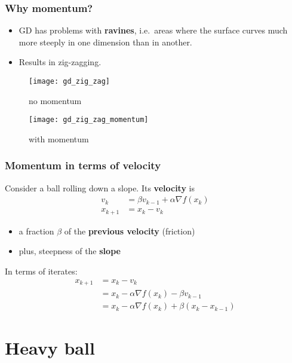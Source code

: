 \documentclass[aspectration=169]{beamer}
\begin{document}
\begin{frame}
  \frametitle{Why momentum?}
  \begin{itemize}
    \item GD has problems with \textbf{ravines}, i.e.\ areas where the surface curves much more steeply in one dimension than in another.
    \item Results in zig-zagging.
  \end{itemize}

  \begin{minipage}{0.48\textwidth}
    \begin{figure}[ht]
      \centering
      \texttt{[image: gd\_zig\_zag]}
      \caption{no momentum}
    \end{figure}
  \end{minipage}
  \begin{minipage}{0.48\textwidth}
    \begin{figure}[ht]
      \centering
      \texttt{[image: gd\_zig\_zag\_momentum]}
      \caption{with momentum}
    \end{figure}
  \end{minipage}
\end{frame}

\begin{frame}
  \frametitle{Momentum in terms of velocity}
  Consider a ball rolling down a slope. Its \textbf{velocity} is
  \begin{align}
    v_k &= \beta v_{k-1} + \alpha \nabla f(x_k) \\
    x_{k+1} &= x_k - v_k
  \end{align}
  \begin{itemize}
    \item a fraction $\beta$ of the \textbf{previous velocity} (friction)
    \item plus, steepness of the \textbf{slope}
  \end{itemize}
  In terms of iterates:
  \begin{align}
    x_{k+1} &= x_k - v_k \\
            &= x_k - \alpha \nabla f(x_k) - \beta v_{k-1} \\
            &= x_k - \alpha \nabla f(x_k) + \beta (x_k - x_{k-1})
  \end{align}
\end{frame}


\section{Heavy ball}%
\label{sec:}
\end{document}
